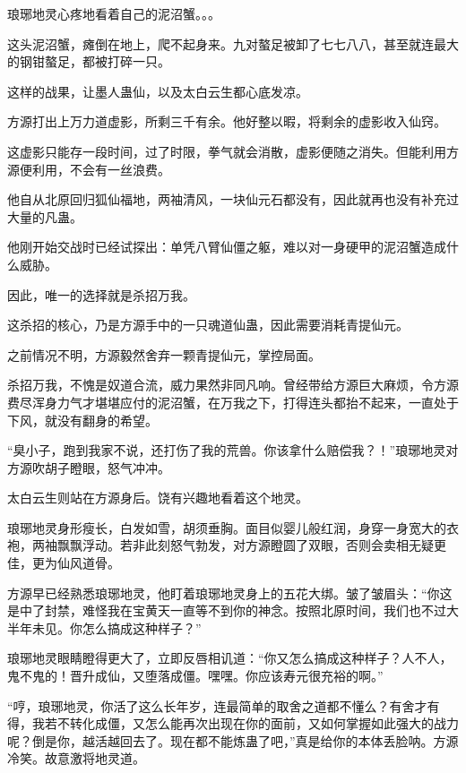 
\begin{this_body}

琅琊地灵心疼地看着自己的泥沼蟹。。。

这头泥沼蟹，瘫倒在地上，爬不起身来。九对螯足被卸了七七八八，甚至就连最大的钢钳螯足，都被打碎一只。

这样的战果，让墨人蛊仙，以及太白云生都心底发凉。

方源打出上万力道虚影，所剩三千有余。他好整以暇，将剩余的虚影收入仙窍。

这虚影只能存一段时间，过了时限，拳气就会消散，虚影便随之消失。但能利用方源便利用，不会有一丝浪费。

他自从北原回归狐仙福地，两袖清风，一块仙元石都没有，因此就再也没有补充过大量的凡蛊。

他刚开始交战时已经试探出：单凭八臂仙僵之躯，难以对一身硬甲的泥沼蟹造成什么威胁。

因此，唯一的选择就是杀招万我。

这杀招的核心，乃是方源手中的一只魂道仙蛊，因此需要消耗青提仙元。

之前情况不明，方源毅然舍弃一颗青提仙元，掌控局面。

杀招万我，不愧是奴道合流，威力果然非同凡响。曾经带给方源巨大麻烦，令方源费尽浑身力气才堪堪应付的泥沼蟹，在万我之下，打得连头都抬不起来，一直处于下风，就没有翻身的希望。

“臭小子，跑到我家不说，还打伤了我的荒兽。你该拿什么赔偿我？！”琅琊地灵对方源吹胡子瞪眼，怒气冲冲。

太白云生则站在方源身后。饶有兴趣地看着这个地灵。

琅琊地灵身形瘦长，白发如雪，胡须垂胸。面目似婴儿般红润，身穿一身宽大的衣袍，两袖飘飘浮动。若非此刻怒气勃发，对方源瞪圆了双眼，否则会卖相无疑更佳，更为仙风道骨。

方源早已经熟悉琅琊地灵，他盯着琅琊地灵身上的五花大绑。皱了皱眉头：“你这是中了封禁，难怪我在宝黄天一直等不到你的神念。按照北原时间，我们也不过大半年未见。你怎么搞成这种样子？”

琅琊地灵眼睛瞪得更大了，立即反唇相讥道：“你又怎么搞成这种样子？人不人，鬼不鬼的！晋升成仙，又堕落成僵。嘿嘿。你应该寿元很充裕的啊。”

“哼，琅琊地灵，你活了这么长年岁，连最简单的取舍之道都不懂么？有舍才有得，我若不转化成僵，又怎么能再次出现在你的面前，又如何掌握如此强大的战力呢？倒是你，越活越回去了。现在都不能炼蛊了吧，”真是给你的本体丢脸呐。方源冷笑。故意激将地灵道。


\end{this_body}
